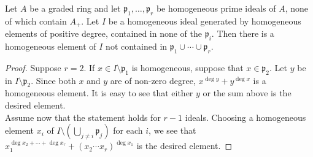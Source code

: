 \begin{exer}
	Let $A$ be a graded ring and let $\mathfrak p_1,\ldots,\mathfrak p_r$ be
	homogeneous prime ideals of $A$, none of which contain $A_+$.
	Let $I$ be a homogeneous ideal generated by homogeneous elements of
	positive degree, contained in none of the $\mathfrak p_i$. Then there is
	a homogeneous element of $I$ not contained in $\mathfrak p_1 \cup \cdots
	\cup \mathfrak p_r$.
\end{exer}
\begin{proof}
	Suppose $r = 2$. If $x \in I \setminus \mathfrak p_1$ is homogeneous,
	suppose that $x \in \mathfrak p_2$. Let $y$ be in $I \setminus \mathfrak
	p_2$. Since both $x$ and $y$ are of non-zero degree, $x^{\deg y} +
	y^{\deg x}$ is a homogeneous element. It is easy to see that either
	$y$ or the sum above is the desired element.\\

	Assume now that the statement holds for $r-1$ ideals. Choosing a
	homogeneous element $x_i$ of $I \setminus (\bigcup_{j \neq i} \mathfrak
	p_j)$ for each $i$, we see that $x_1^{\deg x_2 + \cdots + \deg x_r} +
	(x_2 \cdots x_r)^{\deg x_1}$ is the desired element.
\end{proof}
